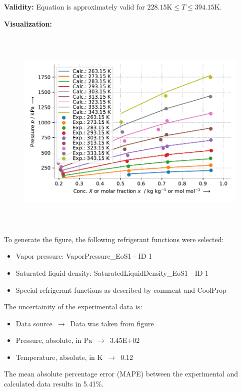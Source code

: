 \textbf{Validity:}
\newline
Equation is approximately valid for $228.15 \si{\kelvin} \leq T \leq 394.15 \si{\kelvin}$.
\newline

\textbf{Visualization:}
%
\begin{figure}[!htp]
{\noindent\includegraphics[height=10cm, keepaspectratio]{figs/abs/abs_R-12_naphthenic__TsubokaKatayama_1.pdf}}
\end{figure}
%

To generate the figure, the following refrigerant functions were selected:
\begin{itemize}
\item Vapor pressure: VaporPressure\_EoS1 - ID 1
\item Saturated liquid density: SaturatedLiquidDensity\_EoS1 - ID 1
\item Special refrigerant functions as described by comment and CoolProp
\end{itemize}

The uncertainity of the experimental data is:
\begin{itemize}
\item Data source $\,\to\,$ Data was taken from figure
\item Pressure, absolute, in $\si{\pascal}$ $\,\to\,$ 3.45E+02
\item Temperature, absolute, in $\si{\kelvin}$ $\,\to\,$ 0.12
\end{itemize}

The mean absolute percentage error (MAPE) between the experimental and calculated data results in 5.41\%.
\FloatBarrier
\newpage
